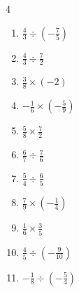 \begin{multicols}{4}
\begin{enumerate}
  \item $\displaystyle \frac{4}{3}\div{}\left(-\frac{7}{5}\right)$


  \item $\displaystyle \frac{4}{3}\div{}\frac{7}{2}$


\columnbreak %

  \item $\displaystyle \frac{3}{8}\times{}\left(-2\right)$


  \item $\displaystyle -\frac{1}{6}\times{}\left(-\frac{5}{9}\right)$


  \item $\displaystyle \frac{5}{8}\times{}\frac{7}{2}$


  \item $\displaystyle \frac{6}{7}\div{}\frac{7}{6}$


  \item $\displaystyle \frac{5}{4}\div{}\frac{6}{5}$


  \item $\displaystyle \frac{7}{9}\times{}\left(-\frac{1}{4}\right)$


  \item $\displaystyle \frac{1}{6}\times{}\frac{3}{5}$


  \item $\displaystyle \frac{4}{5}\div{}\left(-\frac{9}{10}\right)$


  \item $\displaystyle -\frac{1}{8}\div{}\left(-\frac{5}{4}\right)$



\end{enumerate}
\end{multicols}
